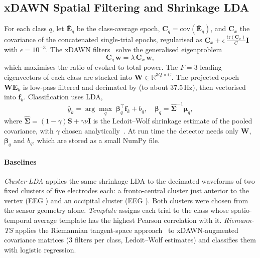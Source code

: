 \documentclass[conference]{IEEEtran}
\begin{document}
\subsection{xDAWN Spatial Filtering and Shrinkage LDA}
For each class $q$, let $\bar{\mathbf{E}}_q$ be the class-average epoch, $\mathbf{C}_q=\mathrm{cov}(\bar{\mathbf{E}}_q)$, and $\mathbf{C}_x$ the covariance of the concatenated single-trial epochs, regularised as $\mathbf{C}_x+\epsilon\,\frac{\mathrm{tr}(\mathbf{C}_x)}{C}\mathbf{I}$ with $\epsilon=10^{-3}$. The xDAWN filters~\cite{rivet2009xdawn} solve the generalised eigenproblem
\begin{equation}
\mathbf{C}_q\,\mathbf{w}=\lambda\,\mathbf{C}_x\,\mathbf{w},
\end{equation}
which maximises the ratio of evoked to total power. The $F=3$ leading eigenvectors of each class are stacked into $\mathbf{W}\in\mathbb{R}^{3Q\times C}$. The projected epoch $\mathbf{W}\mathbf{E}_k$ is low-pass filtered and decimated by \Decim{} (to about 37.5\,Hz), then vectorised into $\mathbf{f}_k$. Classification uses LDA,
\begin{equation}
\hat{y}_k=\arg\max_q\;\boldsymbol{\beta}_q^{\top}\mathbf{f}_k+b_q,\quad \boldsymbol{\beta}_q=\hat{\boldsymbol{\Sigma}}^{-1}\boldsymbol{\mu}_q,
\end{equation}
where $\hat{\boldsymbol{\Sigma}}=(1-\gamma)\mathbf{S}+\gamma\nu\mathbf{I}$ is the Ledoit--Wolf shrinkage estimate of the pooled covariance, with $\gamma$ chosen analytically~\cite{ledoit2004well,blankertz2011tutorial}. At run time the detector needs only $\mathbf{W}$, $\boldsymbol{\beta}_q$ and $b_q$, which are stored as a small NumPy file.

\paragraph*{Baselines} \emph{Cluster-LDA} applies the same shrinkage LDA to the decimated waveforms of two fixed clusters of five electrodes each: a fronto-central cluster just anterior to the vertex (EEG \ClusterFC) and an occipital cluster (EEG \ClusterO). Both clusters were chosen from the sensor geometry alone. \emph{Template} assigns each trial to the class whose spatio-temporal average template has the highest Pearson correlation with it. \emph{Riemann-TS} applies the Riemannian tangent-space approach~\cite{barachant2012riemann} to xDAWN-augmented covariance matrices (3 filters per class, Ledoit--Wolf estimates) and classifies them with logistic regression.
\end{document}
